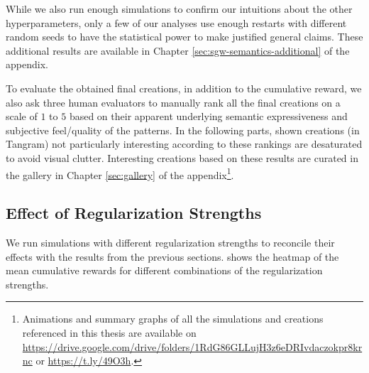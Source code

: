 While we also run enough simulations to confirm our intuitions about the other hyperparameters, only a few of our analyses use enough restarts with different random seeds to have the statistical power to make justified general claims.
These additional results are available in Chapter \ref{sec:sgw-semantics-additional} of the appendix.

To evaluate the obtained final creations, in addition to the cumulative reward, we also ask three human evaluators to manually rank all the final creations on a scale of \(1\) to \(5\) based on their apparent underlying semantic expressiveness and subjective feel/quality of the patterns.
In the following parts, shown creations (in Tangram) not particularly interesting according to these rankings are desaturated to avoid visual clutter.
Interesting creations based on these results are curated in the gallery in Chapter \ref{sec:gallery} of the appendix\footnote[1]{Animations and summary graphs of all the simulations and creations referenced in this thesis are available on \url{https://drive.google.com/drive/folders/1RdG86GLLujH3z6eDRIvdaczokpr8krnc} or \url{https://t.ly/49O3h}.}.




\subsection{Effect of Regularization Strengths}
\label{sec:alpha-beta-semantics}
We run simulations with different regularization strengths to reconcile their effects with the results from the previous sections.
 shows the heatmap of the mean cumulative rewards for different combinations of the regularization strengths.

